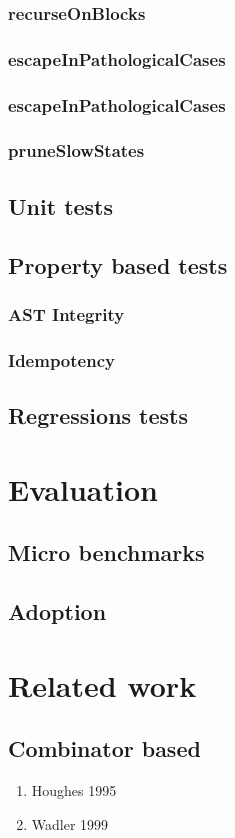 \documentclass[11pt,a4paper]{article}
\begin{document}
\subsubsection{recurseOnBlocks}
\subsubsection{escapeInPathologicalCases}
\subsubsection{escapeInPathologicalCases}
\subsubsection{pruneSlowStates}
\subsection{Unit tests}
\subsection{Property based tests}
\subsubsection{AST Integrity}
\subsubsection{Idempotency}
\subsection{Regressions tests}
\section{Evaluation}
\subsection{Micro benchmarks}
\subsection{Adoption}
\section{Related work}
\subsection{Combinator based}
\begin{enumerate}
  \item Houghes 1995
  \item Wadler 1999
\end{enumerate}
\end{document}
